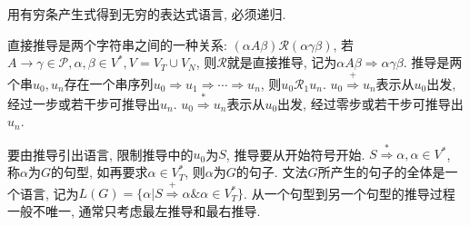         用有穷条产生式得到无穷的表达式语言, 必须递归.

        \textsf{直接推导}是两个字符串之间的一种关系: $(\alpha A\beta)\mathcal{R}(\alpha\gamma\beta)$, 若$A\to\gamma\in\mathcal{P}, \alpha, \beta\in V^*, V=V_T\cup V_N$, 则$\mathcal{R}$就是直接推导, 记为$\alpha A\beta\Rightarrow\alpha\gamma\beta$. \textsf{推导}是两个串$u_0, u_n$存在一个串序列$u_0\Rightarrow u_1\Rightarrow \cdots\Rightarrow u_n$, 则$u_0\mathcal{R}_1u_n$. $u_0\stackrel{+}{\Rightarrow}u_n$表示从$u_0$出发, 经过一步或若干步可推导出$u_n$. $u_0\stackrel{*}{\Rightarrow}u_n$表示从$u_0$出发, 经过零步或若干步可推导出$u_n$. 

        要由推导引出语言, 限制推导中的$u_0$为$S$, 推导要从开始符号开始. $S\stackrel{*}{\Rightarrow}\alpha, \alpha\in V^*$, 称$\alpha$为$G$的\textsf{句型}, 如再要求$\alpha\in V_T^*$, 则$\alpha$为$G$的\textsf{句子}. 文法$G$所产生的句子的全体是一个\textsf{语言}, 记为$L(G)=\{\alpha|S\stackrel{+}{\Rightarrow}\alpha\&\alpha\in V_T^*\}$. 从一个句型到另一个句型的推导过程一般不唯一, 通常只考虑最左推导和最右推导.
